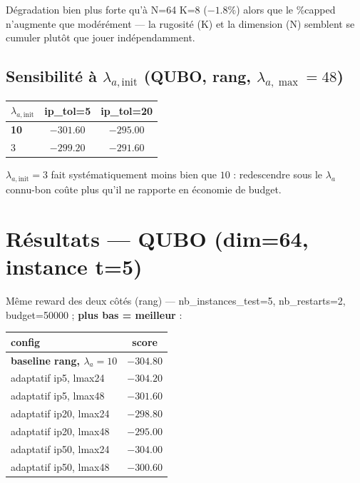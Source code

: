 \documentclass{article}
\begin{document}
Dégradation bien plus forte qu'à N=64 K=8 ($-1.8\%$) alors que le \%capped n'augmente que
modérément — la rugosité (K) et la dimension (N) semblent se cumuler plutôt que jouer
indépendamment.

\subsection{Sensibilité à $\lambda_{a,\mathrm{init}}$ (QUBO, rang, $\lambda_{a,\max}=48$)}
\label{sec:lambdainit}

\begin{center}
\begin{tabular}{@{}lcc@{}}
\toprule
$\lambda_{a,\mathrm{init}}$ & ip\_tol=5 & ip\_tol=20 \\
\midrule
\textbf{10} & $-301.60$ & $-295.00$ \\
3           & $-299.20$ & $-291.60$ \\
\bottomrule
\end{tabular}
\end{center}

$\lambda_{a,\mathrm{init}}=3$ fait systématiquement moins bien que $10$ : redescendre sous le
$\lambda_a$ connu-bon coûte plus qu'il ne rapporte en économie de budget.

\section{Résultats — QUBO (dim=64, instance t=5)}

Même reward des deux côtés (rang) — nb\_instances\_test=5, nb\_restarts=2, budget=50000 ;
\textbf{plus bas = meilleur} :

\begin{center}
\begin{tabular}{@{}lc@{}}
\toprule
config & score \\
\midrule
\textbf{baseline rang, $\lambda_a=10$} & \textbf{$-304.80$} \\
adaptatif ip5, lmax24  & $-304.20$ \\
adaptatif ip5, lmax48  & $-301.60$ \\
adaptatif ip20, lmax24 & $-298.80$ \\
adaptatif ip20, lmax48 & $-295.00$ \\
adaptatif ip50, lmax24 & $-304.00$ \\
adaptatif ip50, lmax48 & $-300.60$ \\
\bottomrule
\end{tabular}
\end{center}
\end{document}
